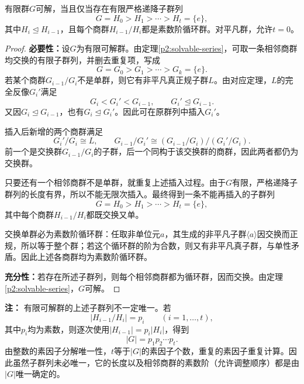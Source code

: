 \begin{theorem}\label{p2:finite-solvable-series}
有限群$G$可解，当且仅当存在有限严格递降子群列
\[
G=H_0>H_1>\cdots>H_t=\{e\},
\]
其中$H_i\trianglelefteq H_{i-1}$，且每个商群$H_{i-1}/H_i$都是素数阶循环群。对平凡群，允许$t=0$。
\end{theorem}
\begin{proof}
\textbf{必要性：}设$G$为有限可解群。由定理\ref{p2:solvable-series}，可取一条相邻商群均交换的有限子群列，并删去重复项，写成
\[
G=G_0>G_1>\cdots>G_k=\{e\}.
\]
若某个商群$G_{i-1}/G_i$不是单群，则它有非平凡真正规子群$L$。由对应定理，$L$的完全反像$G_i'$满足
\[
G_i<G_i'<G_{i-1},\qquad G_i'\trianglelefteq G_{i-1}.
\]
又因$G_i\trianglelefteq G_{i-1}$，也有$G_i\trianglelefteq G_i'$。因此可在原群列中插入$G_i'$。

插入后新增的两个商群满足
\[
G_i'/G_i\cong L,\qquad
G_{i-1}/G_i'\cong(G_{i-1}/G_i)/(G_i'/G_i).
\]
前一个是交换群$G_{i-1}/G_i$的子群，后一个同构于该交换群的商群，因此两者都仍为交换群。

只要还有一个相邻商群不是单群，就重复上述插入过程。由于$G$有限，严格递降子群列的长度有界，所以不能无限次插入。最终得到一条不能再插入的子群列
\[
G=H_0>H_1>\cdots>H_t=\{e\},
\]
其中每个商群$H_{i-1}/H_i$都既交换又单。

交换单群必为素数阶循环群：任取非单位元$a$，其生成的非平凡子群$\langle a\rangle$因交换而正规，所以等于整个群；若这个循环群的阶为合数，则又有非平凡真子群，与单性矛盾。因此上述各商群均为素数阶循环群。

\textbf{充分性：}若存在所述子群列，则每个相邻商群都为循环群，因而交换。由定理\ref{p2:solvable-series}，$G$可解。
\end{proof}

\textbf{注：}
有限可解群的上述子群列不一定唯一。若
\[
|H_{i-1}/H_i|=p_i\qquad(i=1,\ldots,t),
\]
其中$p_i$均为素数，则逐次使用$|H_{i-1}|=p_i|H_i|$，得到
\[
|G|=p_1p_2\cdots p_t.
\]
由整数的素因子分解唯一性，$t$等于$|G|$的素因子个数，重复的素因子重复计算。因此虽然子群列未必唯一，它的长度以及相邻商群的素数阶（允许调整顺序）都是由$|G|$唯一确定的。


